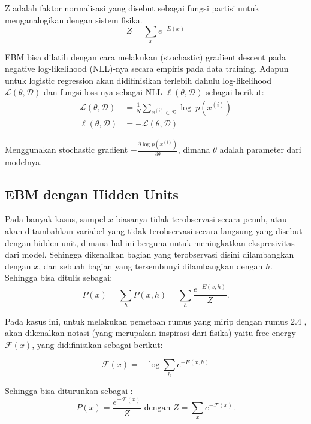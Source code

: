 Z adalah faktor normalisasi yang disebut sebagai fungsi partisi untuk menganalogikan dengan sistem fisika.
\begin{equation}
Z = \sum_x e^{-E(x)}
\end{equation}


EBM bisa dilatih dengan cara melakukan (stochastic) gradient descent pada negative log-likelihood (NLL)-nya secara empiris pada data training. Adapun untuk logistic regression akan didifinisikan terlebih dahulu log-likelihood $\mathcal{L}(\theta, \mathcal{D})$ dan fungsi loss-nya sebagai NLL $\ell (\theta, \mathcal{D})$ sebagai berikut:
\begin{equation}
\begin{aligned}
\mathcal{L}(\theta, \mathcal{D}) &= \frac{1}{N} \sum_{x^{(i)} \in
\mathcal{D}} \log\ p(x^{(i)}) \\
\ell (\theta, \mathcal{D}) &= - \mathcal{L} (\theta, \mathcal{D})
\end{aligned}
\end{equation}


Menggunakan stochastic gradient $-\frac{\partial  \log p(x^{(i)})}{\partial
\theta}$, dimana $\theta$ adalah parameter dari modelnya\citep{poultney2006efficient}.

\subsection{EBM dengan Hidden Units}

Pada banyak kasus, sampel $x$ biasanya tidak terobservasi secara penuh, atau akan ditambahkan variabel yang tidak terobservasi secara langsung yang disebut dengan hidden unit, dimana hal ini berguna untuk meningkatkan ekspresivitas dari model. Sehingga dikenalkan bagian yang terobservasi disini dilambangkan dengan $x$, dan sebuah bagian yang tersembunyi dilambangkan dengan $h$. Sehingga bisa ditulis sebagai:
\begin{equation}
P(x) = \sum_h P(x,h) = \sum_h \frac{e^{-E(x,h)}}{Z}.
\end{equation}

Pada kasus ini, untuk melakukan pemetaan rumus yang mirip dengan rumus 2.4 , akan dikenalkan notasi (yang merupakan inspirasi dari fisika) yaitu free energy $\mathcal{F}(x)$, yang didifinisikan sebagai berikut:

\begin{equation}
\mathcal{F}(x) = - \log \sum_h e^{-E(x,h)}
\end{equation}

Sehingga bisa diturunkan sebagai :
\[P(x) = \frac{e^{-\mathcal{F}(x)}}{Z} \text{ dengan } Z=\sum_x e^{-\mathcal{F}(x)}.\]

